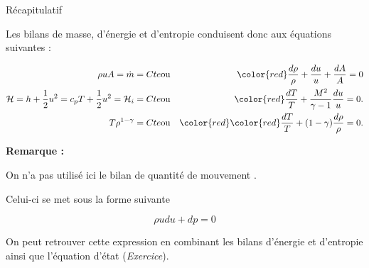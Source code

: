 \begin{frame}{Récapitulatif}

\small

Les bilans de masse, d'énergie et d'entropie conduisent donc aux équations suivantes :

\begin{eqnarray}
	\rho u A = \dot{m} = Cte & \mbox{ou} & \color{red}\frac{d\rho}{\rho} + \frac{du}{u} + \frac{dA}{A} = 0
	\\
     {\cal H}  = h + \frac{1}{2}u^2 = c_p T + \frac{1}{2}u^2 = {\cal H}_i = Cte & \mbox{ou} & \color{red} \frac{dT}{T}  + \frac{M^2}{\gamma - 1} \frac{du}{u} = 0. 
     \\
     T \rho^{1-\gamma} = Cte & \mbox{ou} & \color{red} \color{red} \frac{dT}{T} +  (1- \gamma) \frac{d\rho}{\rho}  = 0.
     \end{eqnarray}

\bigskip

{\bf Remarque :} 

On n'a pas utilisé ici le bilan de quantité de mouvement .

Celui-ci se met sous la forme suivante 

$$ \rho u du + dp =0 $$

On peut  retrouver cette expression en combinant les bilans d'énergie et  d'entropie ainsi que l'équation d'état ({\em Exercice}).


\vspace{10mm}

\end{frame}


